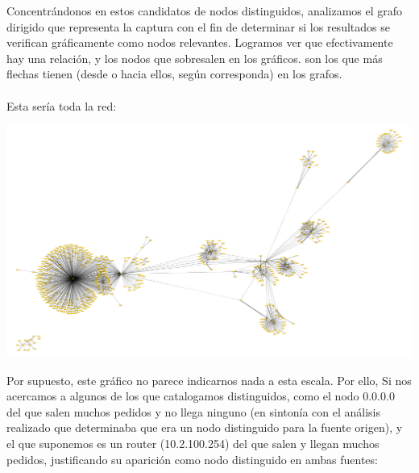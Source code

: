 \indent Concentrándonos en estos candidatos de nodos distinguidos, analizamos el grafo dirigido que representa la captura con el fin de determinar si los resultados se verifican gráficamente como nodos relevantes. Logramos ver que efectivamente hay una relación, y los nodos que sobresalen en los gráficos. son los que más flechas tienen (desde o hacia ellos, según corresponda) en los grafos.\\
\\
\indent Esta sería toda la red:\\
\begin{center}
\includegraphics[scale=0.5,clip=true,trim=140 0 0 0]{graphics/toda_la_red.png}
\end{center}
\newpage
\indent Por supuesto, este gráfico no parece indicarnos nada a esta escala. Por ello,
\indent Si nos acercamos a algunos de los que catalogamos distinguidos, como el nodo 0.0.0.0 del que salen muchos pedidos y no llega ninguno (en sintonía con el análisis realizado que determinaba que era un nodo distinguido para la fuente origen), y el que suponemos es un router (10.2.100.254) del que salen y llegan muchos pedidos, justificando su aparición como nodo distinguido en ambas fuentes:\\

